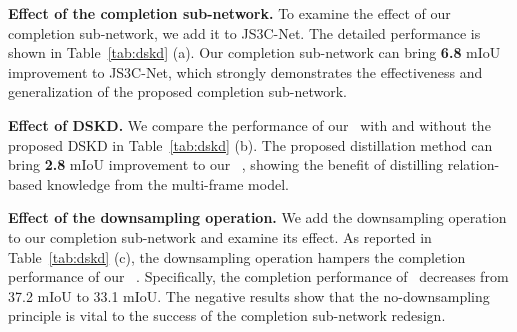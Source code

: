 \documentclass[10pt,twocolumn,letterpaper]{article}
\begin{document}
\begin{table}[!t]
\caption{Impact of the completion sub-network, DSKD and downsampling operation on the performance.}
\label{tab:dskd}
\centering
\vskip -0.3cm
\qquad \qquad \qquad
{}\qquad \qquad \qquad
{}
\vspace{-2ex}
\end{table}

\noindent \textbf{Effect of the completion sub-network.} To examine the effect of our completion sub-network, we add it to JS3C-Net. The detailed performance is shown in Table~\ref{tab:dskd} (a). Our completion sub-network can bring \textbf{6.8} mIoU improvement to JS3C-Net, which strongly demonstrates the effectiveness and generalization of the proposed completion sub-network.

\noindent \textbf{Effect of DSKD.} We compare the performance of our \algorithmname~with and without the proposed DSKD in Table~\ref{tab:dskd} (b). The proposed distillation method can bring \textbf{2.8} mIoU improvement to our \algorithmname~, showing the benefit of distilling relation-based knowledge from the multi-frame model.

\noindent \textbf{Effect of the downsampling operation.} We add the downsampling operation to our completion sub-network and examine its effect. As reported in Table~\ref{tab:dskd} (c), the downsampling operation hampers the completion performance of our \algorithmname~. Specifically, the completion performance of \algorithmname~decreases from 37.2 mIoU to 33.1 mIoU. The negative results show that the no-downsampling principle is vital to the success of the completion sub-network redesign.
 
\end{document}
